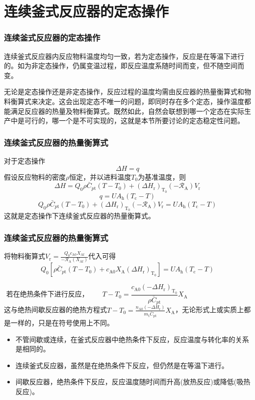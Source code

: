 \documentclass[dvipsnames, svgnames, x11names]{beamer}
\begin{document}
\section{连续釜式反应器的定态操作}


\begin{frame}
    \frametitle{连续釜式反应器的定态操作}

    \large 连续釜式反应器内反应物料温度均匀一致，若为定态操作，反应是在等温下进行的。如为非定态操作，仍属变温过程，即反应温度系随时间而变，但不随空间而变。
    
    无论是定态操作还是非定态操作，反应过程的温度均需由反应器的热量衡算式和物料衡算式来决定。这会出现定态不唯一的问题，即同时存在多个定态，操作温度都能满足反应器的热量及物料衡算式。既然如此，自然会联想到哪一个定态在实际生产中是可行的，哪一个是不可实现的，这就是本节所要讨论的定态稳定性问题。

\end{frame}


\begin{frame}
    \frametitle{连续釜式反应器的热量衡算式}

    \large 对于定态操作
    \[
        \Delta H = q
    \]
    假设反应物料的密度$\rho$恒定，并以进料温度$T_0$为基准温度，则
    \[
        \Delta H=Q_{0} \rho \bar{C}_{p \mathrm{t}}(T-T_{0})+(\Delta H_{\mathrm{r}})_{\mathrm{T}_{0}}(-\mathscr{R}_{\mathrm{A}}) V_{\mathrm{r}}
    \]
    \[
        q=U A_{\mathrm{h}}(T_{\mathrm{c}}-T)
    \]
    \[
       Q_{0} \rho \bar{C}_{p \mathrm{t}}(T-T_{0})+(\Delta H_{\mathrm{r}})_{\mathrm{T}_{0}}(-\mathscr{R}_{\mathrm{A}}) V_{\mathrm{r}} = U A_{\mathrm{h}}(T_{\mathrm{c}}-T)
    \]
    这就是定态操作下连续釜式反应器的热量衡算式。

\end{frame}


\begin{frame}
    \frametitle{连续釜式反应器的热量衡算式}

    将物料衡算式$V_{\mathrm{r}}=\frac{Q_{0} c_{\mathrm{A} 0} X_{\mathrm{Af}}}{-\mathscr{R}_{\mathrm{A}}(X_{\mathrm{Af}})}$代入可得
    \[
        Q_{0}[\rho \bar{C}_{p \mathrm{t}}(T-T_{0})+c_{\mathrm{A} 0} X_{\mathrm{A}}(\Delta H_{\mathrm{r}})_{\mathrm{T}_{0}}]=U A_{\mathrm{h}}(T_{\mathrm{c}}-T)
    \]
    
    \[
        \text{若在绝热条件下进行反应，} \qquad T-T_{0}=\frac{{c_{\mathrm{A} 0}}(-\Delta H_{\mathrm{r}})_{\mathrm{T}_{0}}}{\rho \bar{C}_{p \mathrm{t}}} X_{\mathrm{A}} \qquad\qquad\qquad\qquad~~~~
    \]
    这与绝热间歇反应器的绝热方程式$T-T_{0}=\frac{n_{\mathrm{A} 0}(-\Delta H_{\mathrm{r}})}{m_{\mathrm{t}} \bar{C}_{\mathrm{pt}}} X_{\mathrm{A}}$，无论形式上或实质上都是一样的，只是在符号使用上不同。
    \begin{itemize}
        \item 不管间歇或连续，在釜式反应器中绝热条件下反应，反应温度与转化率的关系是相同的。
        \item 连续釜式反应器，虽然是在绝热条件下反应，但仍然是在等温下进行。
        \item 间歇反应器，绝热条件下反应，反应温度随时间而升高(放热反应)或降低(吸热反应)。
    \end{itemize}
\end{frame}
\end{document}
